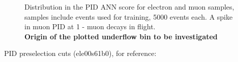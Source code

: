 \begin{figure}
  \label{fig:pid_training_2}
  \caption{
    Distribution in the PID ANN score for electron and muon samples, samples include events used for training,
    5000 events each. A spike in muon PID at 1  - muon decays in flight. \\ 
    {\color{red} \bf Origin of the plotted underflow bin to be investigated}
  }
\end{figure}

PID preselection cuts (ele00s61b0), for reference:

